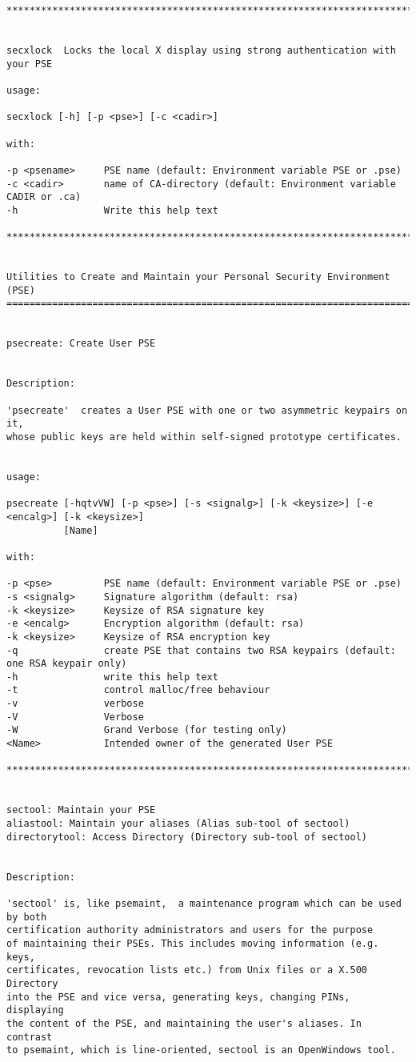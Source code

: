 {\begin{verbatim}
****************************************************************************************


secxlock  Locks the local X display using strong authentication with your PSE

usage:

secxlock [-h] [-p <pse>] [-c <cadir>]

with:

-p <psename>     PSE name (default: Environment variable PSE or .pse)
-c <cadir>       name of CA-directory (default: Environment variable CADIR or .ca)
-h               Write this help text

****************************************************************************************


Utilities to Create and Maintain your Personal Security Environment (PSE)
=========================================================================


psecreate: Create User PSE


Description:

'psecreate'  creates a User PSE with one or two asymmetric keypairs on it,
whose public keys are held within self-signed prototype certificates.


usage:

psecreate [-hqtvVW] [-p <pse>] [-s <signalg>] [-k <keysize>] [-e <encalg>] [-k <keysize>] 
          [Name]

with:

-p <pse>         PSE name (default: Environment variable PSE or .pse)
-s <signalg>     Signature algorithm (default: rsa)
-k <keysize>     Keysize of RSA signature key
-e <encalg>      Encryption algorithm (default: rsa)
-k <keysize>     Keysize of RSA encryption key
-q               create PSE that contains two RSA keypairs (default: one RSA keypair only)
-h               write this help text
-t               control malloc/free behaviour
-v               verbose
-V               Verbose
-W               Grand Verbose (for testing only)
<Name>           Intended owner of the generated User PSE

****************************************************************************************


sectool: Maintain your PSE
aliastool: Maintain your aliases (Alias sub-tool of sectool)
directorytool: Access Directory (Directory sub-tool of sectool)


Description:

'sectool' is, like psemaint,  a maintenance program which can be used by both
certification authority administrators and users for the purpose
of maintaining their PSEs. This includes moving information (e.g. keys,
certificates, revocation lists etc.) from Unix files or a X.500 Directory
into the PSE and vice versa, generating keys, changing PINs, displaying
the content of the PSE, and maintaining the user's aliases. In contrast
to psemaint, which is line-oriented, sectool is an OpenWindows tool.



\end{verbatim}}
